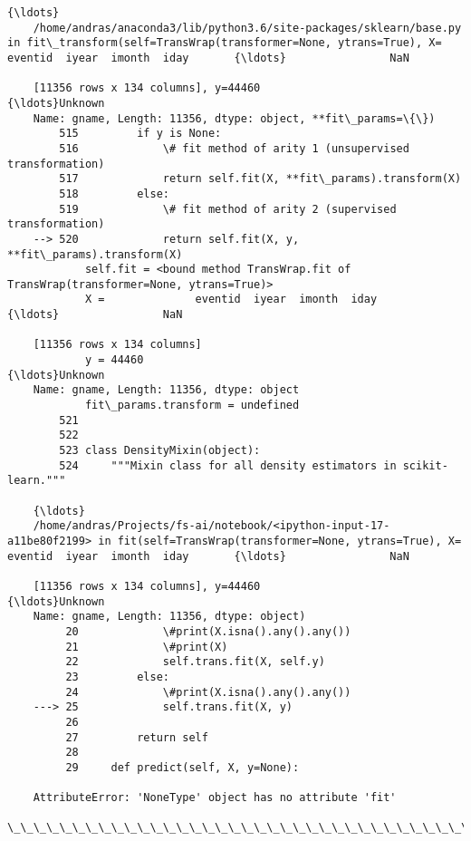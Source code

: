 \documentclass[11pt]{article}
\begin{document}
\begin{Verbatim}[commandchars=\\\{\}]
    {\ldots}
    /home/andras/anaconda3/lib/python3.6/site-packages/sklearn/base.py in fit\_transform(self=TransWrap(transformer=None, ytrans=True), X=             eventid  iyear  imonth  iday       {\ldots}                NaN  
    
    [11356 rows x 134 columns], y=44460                                           {\ldots}Unknown
    Name: gname, Length: 11356, dtype: object, **fit\_params=\{\})
        515         if y is None:
        516             \# fit method of arity 1 (unsupervised transformation)
        517             return self.fit(X, **fit\_params).transform(X)
        518         else:
        519             \# fit method of arity 2 (supervised transformation)
    --> 520             return self.fit(X, y, **fit\_params).transform(X)
            self.fit = <bound method TransWrap.fit of TransWrap(transformer=None, ytrans=True)>
            X =              eventid  iyear  imonth  iday       {\ldots}                NaN  
    
    [11356 rows x 134 columns]
            y = 44460                                           {\ldots}Unknown
    Name: gname, Length: 11356, dtype: object
            fit\_params.transform = undefined
        521 
        522 
        523 class DensityMixin(object):
        524     """Mixin class for all density estimators in scikit-learn."""
    
    {\ldots}
    /home/andras/Projects/fs-ai/notebook/<ipython-input-17-a11be80f2199> in fit(self=TransWrap(transformer=None, ytrans=True), X=             eventid  iyear  imonth  iday       {\ldots}                NaN  
    
    [11356 rows x 134 columns], y=44460                                           {\ldots}Unknown
    Name: gname, Length: 11356, dtype: object)
         20             \#print(X.isna().any().any())
         21             \#print(X)
         22             self.trans.fit(X, self.y)
         23         else:
         24             \#print(X.isna().any().any())
    ---> 25             self.trans.fit(X, y)
         26         
         27         return self
         28 
         29     def predict(self, X, y=None):
    
    AttributeError: 'NoneType' object has no attribute 'fit'
    \_\_\_\_\_\_\_\_\_\_\_\_\_\_\_\_\_\_\_\_\_\_\_\_\_\_\_\_\_\_\_\_\_\_\_\_\_\_\_\_\_\_\_\_\_\_\_\_\_\_\_\_\_\_\_\_\_\_\_\_\_\_\_\_\_\_\_\_\_\_\_\_\_\_\_

    \end{Verbatim}


    
    
    
    
\end{document}
